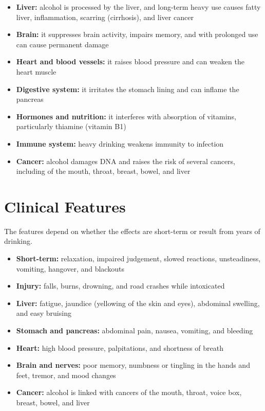 \begin{itemize}
    \item \textbf{Liver:} alcohol is processed by the liver, and long-term heavy use causes fatty liver, inflammation, scarring (cirrhosis), and liver cancer
    \item \textbf{Brain:} it suppresses brain activity, impairs memory, and with prolonged use can cause permanent damage
    \item \textbf{Heart and blood vessels:} it raises blood pressure and can weaken the heart muscle
    \item \textbf{Digestive system:} it irritates the stomach lining and can inflame the pancreas
    \item \textbf{Hormones and nutrition:} it interferes with absorption of vitamins, particularly thiamine (vitamin B1)
    \item \textbf{Immune system:} heavy drinking weakens immunity to infection
    \item \textbf{Cancer:} alcohol damages DNA and raises the risk of several cancers, including of the mouth, throat, breast, bowel, and liver
\end{itemize}

\section*{Clinical Features}
The features depend on whether the effects are short-term or result from years of drinking.

\begin{itemize}
    \item \textbf{Short-term:} relaxation, impaired judgement, slowed reactions, unsteadiness, vomiting, hangover, and blackouts
    \item \textbf{Injury:} falls, burns, drowning, and road crashes while intoxicated
    \item \textbf{Liver:} fatigue, jaundice (yellowing of the skin and eyes), abdominal swelling, and easy bruising
    \item \textbf{Stomach and pancreas:} abdominal pain, nausea, vomiting, and bleeding
    \item \textbf{Heart:} high blood pressure, palpitations, and shortness of breath
    \item \textbf{Brain and nerves:} poor memory, numbness or tingling in the hands and feet, tremor, and mood changes
    \item \textbf{Cancer:} alcohol is linked with cancers of the mouth, throat, voice box, breast, bowel, and liver
\end{itemize}

